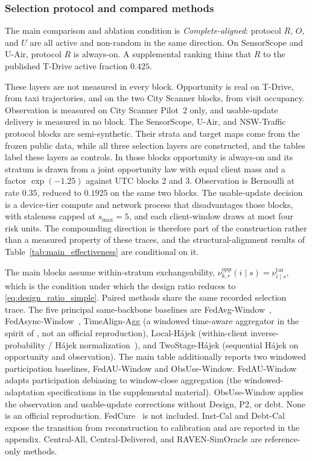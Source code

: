 \subsubsection{Selection protocol and compared methods}

The main comparison and ablation condition is \emph{Complete-aligned}: protocol $R$, $O$,
and $U$ are all active and non-random in the same direction.  On
SensorScope and U-Air, protocol $R$ is always-on.  A supplemental ranking
thins that $R$ to the published T-Drive active fraction $0.425$.

These layers are not measured in every block.  Opportunity is real on T-Drive,
from taxi trajectories, and on the two City Scanner blocks, from visit
occupancy.  Observation is measured on City Scanner Pilot~2 only, and
usable-update delivery is measured in no block.  The SensorScope, U-Air, and
NSW-Traffic protocol blocks are semi-synthetic.  Their strata and target maps
come from the frozen public data, while all three selection layers are
constructed, and the tables label these layers as controls.  In those blocks
opportunity is always-on and its stratum is drawn from a joint opportunity law
with equal client mass and a factor $\exp(-1.25)$ against UTC blocks 2 and 3.
Observation is Bernoulli at rate $0.35$, reduced to $0.1925$ on the same two
blocks.  The usable-update decision is a device-tier compute and network
process that disadvantages those blocks, with staleness capped at
$s_{\max}=5$, and each client-window draws at most four risk units.  The
compounding direction is therefore part of the construction rather than a
measured property of these traces, and the structural-alignment results of
Table~\ref{tab:main_effectiveness} are conditional on it.

The main blocks assume within-stratum exchangeability,
$\nu^{\mathrm{opp}}_{k,r}(i\mid s)=\nu^{\mathrm{tar}}_{i\mid s}$, which is the
condition under which the design ratio reduces to
\eqref{eq:design_ratio_simple}.  Paired methods share the same recorded selection trace.
The five principal same-backbone baselines are
FedAvg-Window~\cite{mcmahan2017communication},
FedAsync-Window~\cite{xie2019asynchronous},
TimeAlign-Agg (a windowed time-aware aggregator in the spirit of
\cite{wang2026federated}, not an official reproduction),
Local-H\'ajek (within-client inverse-probability / H\'ajek
normalization~\cite{horvitz1952generalization,hajek1971comment}), and
TwoStage-H\'ajek (sequential H\'ajek on opportunity and
observation).  The main table additionally
reports two windowed participation baselines, FedAU-Window and
ObsUse-Window.  FedAU-Window adapts participation debiasing
\cite{wang2024lightweight} to window-close aggregation
(the windowed-adaptation specifications in the supplemental material).
ObsUse-Window applies the observation and usable-update
corrections without Design, P2, or debt.  None is an official
reproduction.  FedCure~\cite{chen2026fedcure} is not included.  Inst-Cal and Debt-Cal
expose the transition from reconstruction to calibration and are
reported in the appendix.  Central-All, Central-Delivered, and
RAVEN-SimOracle are reference-only methods.

